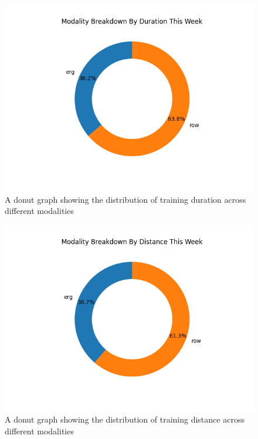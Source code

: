 \begin{figure}[!hp]
  \centering
  \includegraphics[width=\linewidth]{figures/durationDonut.png}
  \captionsetup{justification=centering}
  \caption*{\label{fig:app_durationDonut}A donut graph showing the distribution of training duration across different modalities}
\end{figure}
\begin{figure}[!hp]
  \centering
  \includegraphics[width=\linewidth]{figures/distanceDonut.png}
  \captionsetup{justification=centering}
  \caption*{\label{fig:app_distanceDonut}A donut graph showing the distribution of training distance across different modalities}
\end{figure}

